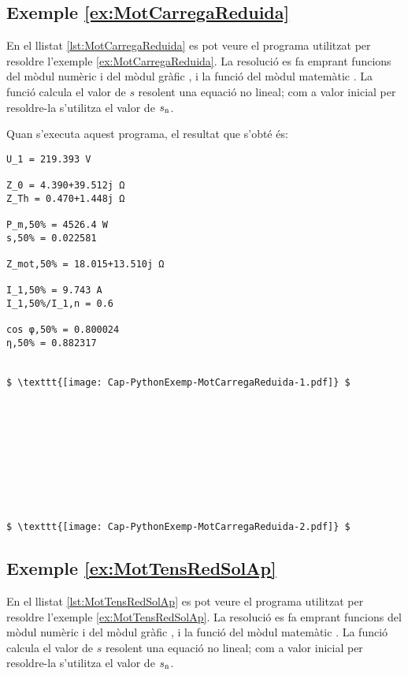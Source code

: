 \hypertarget{exemple:MotCarregaReduida}{\subsection{Exemple \ref*{ex:MotCarregaReduida} \MotCarregaReduida}}
En el llistat \vref{lst:MotCarregaReduida} es pot veure el programa utilitzat per resoldre l'exemple \vref{ex:MotCarregaReduida}. La resolució es fa emprant funcions del mòdul numèric  i del mòdul gràfic , i la funció  del mòdul matemàtic . La funció  calcula el valor de $s$ resolent una equació no lineal; com a valor inicial per resoldre-la  s'utilitza el valor de $s_\mathrm{n}$.


Quan s'executa aquest programa, el resultat que s'obté és:
\lstset{
	language=,
	numbers=none,
	frame=none
}
\begin{lstlisting}[mathescape=true]
U_1 = 219.393 V

Z_0 = 4.390+39.512j Ω
Z_Th = 0.470+1.448j Ω

P_m,50% = 4526.4 W
s,50% = 0.022581

Z_mot,50% = 18.015+13.510j Ω

I_1,50% = 9.743 A
I_1,50%/I_1,n = 0.6

cos φ,50% = 0.800024
η,50% = 0.882317
	
		
$ \texttt{[image: Cap-PythonExemp-MotCarregaReduida-1.pdf]} $










$ \texttt{[image: Cap-PythonExemp-MotCarregaReduida-2.pdf]} $
\end{lstlisting} 


\hypertarget{exemple:MotTensRedSolAp}{\subsection{Exemple \ref*{ex:MotTensRedSolAp} \MotTensRedSolAp}}
En el llistat \vref{lst:MotTensRedSolAp} es pot veure el programa utilitzat per resoldre l'exemple \vref{ex:MotTensRedSolAp}. La resolució es fa emprant funcions del mòdul numèric  i del mòdul gràfic , i la funció  del mòdul matemàtic . La funció  calcula el valor de $s$ resolent una equació no lineal; com a valor inicial per resoldre-la  s'utilitza el valor de $s_\mathrm{n}$.


